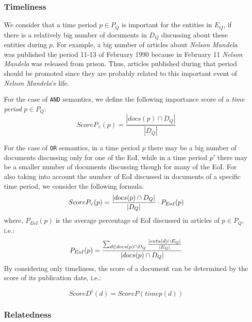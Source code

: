 \documentclass{article}
\begin{document}
\subsubsection*{Timeliness}

We consider that a time period $p \in P_Q$ is important
for the entities in $E_Q$, if there is a relatively big number of documents in $D_Q$
discussing about these entities during $p$.
For example, a big number of articles about {\em Nelson Mandela}
was published the period 11-13 of February 1990 because
in February 11 {\em Nelson Mandela} was released from prison.
Thus, articles published during that period should be promoted since
they are probably related to this important event of {\em Nelson Mandela}'s life.

For the case of {\tt AND} semantics,
we define the following importance score of a {\em time period} $p \in P_Q$:
\begin{equation}
ScoreP_\wedge(p) = \frac{|docs(p) \cap D_Q|}{|D_Q|}
\end{equation}

For the case of {\tt OR} semantics,
in a time period $p$ there may be a
big number of documents discussing only for one of the EoI,
while in a time period $p'$ there may be a smaller number
of documents discussing though for many of the EoI.
For also taking into account the number of EoI discussed in documents
of a specific time period, we consider the following formula:
\begin{equation}
\small
ScoreP_\vee(p) = \frac{|docs(p) \cap D_Q|}{|D_Q|} \cdot P_{EoI}(p)
\end{equation}
where, $P_{EoI}(p)$ is the average percentage of EoI discussed in articles of $p \in P_Q$, i.e.:
\begin{equation}
\small
P_{EoI}(p) =  \frac{\sum_{d \in docs(p) \cap D_Q}{\frac{|ents(d) \cap E_Q|}{|E_Q|}}}{|docs(p) \cap D_Q|}
\end{equation}
By considering only timeliness,
the score of a document can be determined by the score
of its publication date, i.e.:

\begin{equation}
ScoreD^{t}(d) = ScoreP(timep(d))
\end{equation}

\subsubsection*{Relatedness}
\end{document}
